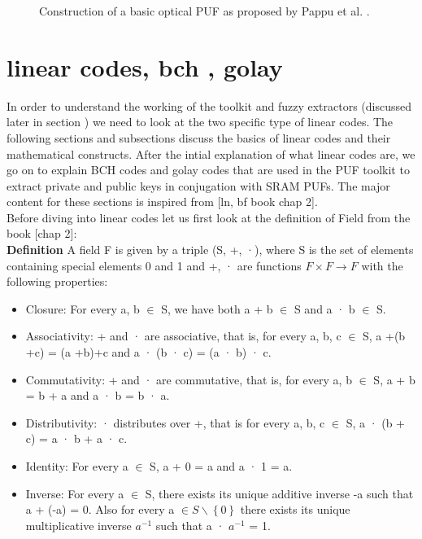 \begin{figure}
\centering
{}
\caption{Construction of a basic optical PUF as proposed by Pappu et al. \cite{18,19}.}
\label{img:3}
\end{figure}

\section{linear codes, bch , golay}
In order to understand the working of the toolkit and fuzzy extractors (discussed later in section ) we need to look at the two specific type of linear codes. The following sections and subsections discuss the basics of linear codes and their mathematical constructs. After the intial explanation of what linear codes are, we go on to explain BCH codes and golay codes that are used in the PUF toolkit to extract private and public keys in conjugation with SRAM PUFs. The major
content for these sections is inspired from [ln, bf book chap 2].\\

Before diving into linear codes let us first look at the definition of Field from the book [chap 2]:\\
\textbf{Definition} A field F is given by a triple (S, +, ·), where S is the set of elements containing
special elements 0 and 1 and +, · are functions $F \times F \rightarrow F$ with the following properties:
\begin{itemize}
	\item Closure: For every a, b $\in$ S, we have both a + b $\in$ S and a · b $\in$ S.
	\item Associativity: + and · are associative, that is, for every a, b, c $\in$ S, a +(b +c) = (a +b)+c and a · (b · c) = (a · b) · c.
	\item Commutativity: + and · are commutative, that is, for every a, b $\in$ S, a + b = b + a and a · b = b · a.
	\item Distributivity: · distributes over +, that is for every a, b, c $\in$ S, a · (b + c) = a · b + a · c.
	\item Identity: For every a $\in$ S, a + 0 = a and a · 1 = a.
	\item Inverse: For every a $\in$ S, there exists its unique additive inverse -a such that a + (-a) = 0. Also for every a $\in S \backslash \left\{0\right\}$ there exists its unique multiplicative inverse $a^{-1}$ such that a · $a^{-1}$ = 1.
\end{itemize}

